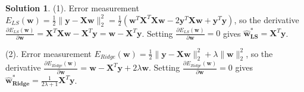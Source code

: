 \documentclass[a4paper,UTF8]{article}
\numberwithin{equation}{section}
\theoremstyle{definition}
\newtheorem*{solution}{Solution}
\begin{document}
\begin{solution}
\item[(1).] Error measurement $E_{LS}(\bm{w})=\frac{1}{2}\lVert \mathbf{y} - \mathbf {X}\mathbf{w} \rVert_2^2=\frac{1}{2}(\bm{w}^T\bm{X}^T\bm{Xw}-2\bm{y}^T\bm{Xw}+\bm{y}^T\bm{y})$, so the derivative $\frac{\partial E_{LS}(\bm{w})}{\partial\bm{w}}=\bm{X}^T\bm{Xw}-\bm{X}^T\bm{y}=\bm{w}-\bm{X}^T\bm{y}$. Setting $\frac{\partial E_{LS}(\bm{w})}{\partial\bm{w}}=0$ gives $\bm{\hat{w}_{LS}^*}=\bm{X}^T\bm{y}$.

\item[(2).] Error measurement $E_{Ridge}(\bm{w})= \frac{1}{2}\lVert \mathbf{y} - \mathbf X \mathbf{w} \rVert_2^2 +\lambda\lVert \mathbf{w}\rVert_2^2$, so the derivative $\frac{\partial E_{Ridge}(\bm{w})}{\partial\bm{w}} = \bm{w}-\bm{X}^T\bm{y}+2\lambda\bm{w}$. Setting $\frac{\partial E_{Ridge}(\bm{w})}{\partial\bm{w}}=0$ gives $\bm{\hat{w}_{Ridge}^*}=\frac{1}{2\lambda+1}\bm{X}^T\bm{y}$.


\end{solution}
\end{document}
